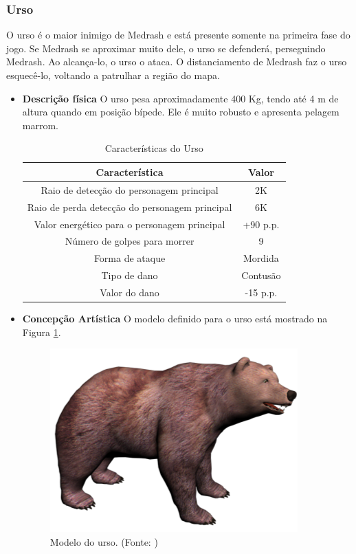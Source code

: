 \subsubsection{Urso}
O urso é o maior inimigo de Medrash e está presente somente na primeira
 fase do jogo. Se Medrash se aproximar muito dele, o urso se defenderá,
 perseguindo Medrash. Ao alcança-lo, o urso o ataca. O distanciamento de
 Medrash faz o urso esquecê-lo, voltando a patrulhar a região do mapa.
\begin{itemize}
\item {\bf Descrição física}
O urso pesa aproximadamente 400 Kg, tendo até 4 m de altura quando em
 posição bípede. Ele é muito robusto e apresenta pelagem marrom.


\begin{table}[H]
\begin{center}
\begin{tabular}{|c|c|}
\hline 
\textbf{Característica} & \textbf{Valor} \\ 
\hline 
Raio de detecção do personagem principal & 2K \\ 
\hline 
Raio de perda detecção do personagem principal & 6K \\ 
\hline 
Valor energético para o personagem principal & +90 p.p. \\ 
\hline 
Número de golpes para morrer & 9 \\ 
\hline 
Forma de ataque & Mordida \\ 
\hline 
Tipo de dano & Contusão \\ 
\hline 
Valor do dano & -15 p.p. \\ 
\hline 
\end{tabular} 
\caption{Características do Urso}
\end{center}
\end{table}


\item {\bf Concepção Artística}
O modelo definido para o urso está mostrado na Figura \ref{img:urso}.

\begin{figure}[H]
 \centering
 \includegraphics[scale=0.8]{Imagens/urso01.png}
 \caption{Modelo do urso. (Fonte: \cite{bib:urso01})}
\label{img:urso}
\end{figure}


\end{itemize}
